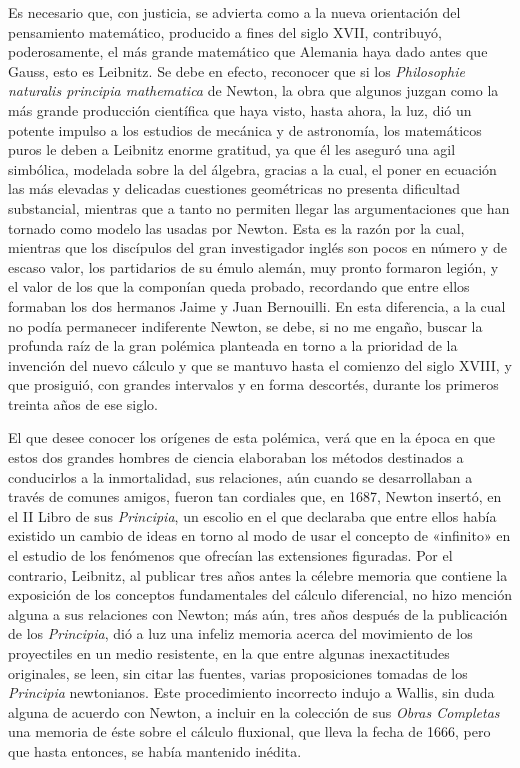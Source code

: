 \documentclass[a4paper, 12pt, draft]{article}
\begin{document}
{Es necesario que, con justicia, se advierta como a la nueva orientación del pensamiento matemático, producido a fines del siglo XVII, contribuyó, poderosamente, el más grande matemático que Alemania haya dado antes que Gauss, esto es Leibnitz. Se debe en efecto, reconocer que si los \textit{ Philosophie naturalis principia mathematica} de Newton, la obra que algunos juzgan como la más grande producción científica que haya visto, hasta ahora, la luz, dió un potente impulso a los estudios de mecánica y de astronomía, los matemáticos puros le deben a Leibnitz
enorme gratitud, ya que él les aseguró una agil simbólica, modelada sobre la del álgebra, gracias a la
cual, el poner en ecuación las más elevadas y delicadas cuestiones geométricas no presenta dificultad substancial, mientras que a tanto no permiten llegar las argumentaciones que han tornado como modelo las usadas por Newton. Esta es la razón por la cual, mientras que los discípulos del gran investigador inglés son pocos en número y de escaso valor, los partidarios de su émulo alemán, muy pronto formaron legión, y el valor de los que la componían queda probado, recordando que entre ellos formaban los dos hermanos Jaime y Juan Bernouilli. En esta diferencia, a la cual no podía permanecer indiferente Newton, se debe, si no me engaño, buscar la profunda raíz de la gran polémica planteada en torno a la prioridad de la invención del nuevo cálculo y que se mantuvo hasta el comienzo del siglo XVIII, y que prosiguió, con grandes intervalos y en forma descortés, durante los primeros treinta años de ese siglo.




El que desee conocer los orígenes de esta polémica, verá que en la época en que estos dos grandes hombres de ciencia elaboraban los métodos destinados a conducirlos a la inmortalidad, sus relaciones, aún cuando se desarrollaban a través de comunes amigos, fueron tan cordiales que, en 1687, Newton insertó, en el II Libro de sus \textit{ Principia}, un escolio en el que declaraba que entre ellos había existido un cambio de ideas en torno al modo de usar el concepto de «infinito» en el estudio de los fenómenos que ofrecían las extensiones figuradas. Por el contrario, Leibnitz, al publicar tres años antes la célebre memoria que contiene la exposición de los conceptos fundamentales del cálculo diferencial, no hizo mención alguna a sus relaciones con Newton; más aún, tres años después de la publicación de los \textit{ Principia}, dió a luz una infeliz memoria acerca del movimiento de los proyectiles en un medio resistente, en la que entre algunas inexactitudes originales, se leen, sin citar las fuentes, varias proposiciones tomadas de los \textit{ Principia} newtonianos. Este procedimiento incorrecto indujo a Wallis, sin duda alguna de acuerdo con Newton, a incluir en la colección de sus \textit{ Obras Completas} una memoria de éste sobre el cálculo fluxional, que lleva la fecha de 1666, pero que hasta entonces, se había mantenido inédita.

}
\end{document}
